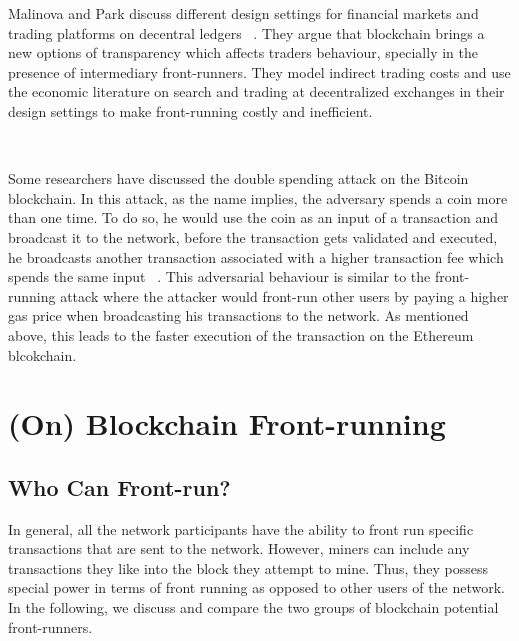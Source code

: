 Malinova and Park discuss different design settings for financial markets and trading platforms on decentral ledgers ~\cite{malinova2017market}.  They argue that blockchain brings a new options of transparency which affects traders behaviour, specially in the presence of intermediary front-runners. They model indirect trading costs and use the economic literature on search and trading at decentralized exchanges in their design settings to make front-running costly and inefficient.


 ~\cite{breidenbach2018enter}
 
Some researchers have discussed the double spending attack on the Bitcoin blockchain. In this attack, as the name implies, the adversary spends a coin more than one time. To do so, he would use the coin as an input of a transaction and broadcast it to the network, before the transaction gets validated and executed, he broadcasts another transaction associated with a higher transaction fee which spends the same input ~\cite{bamert2013have, karame2012double}. This adversarial behaviour is similar to the front-running attack where the attacker would front-run other users by paying a higher gas price when broadcasting his transactions to the network.  As mentioned above, this leads to the faster execution of the transaction on the Ethereum blcokchain.









\section{(On) Blockchain Front-running}

\subsection{Who Can Front-run?}
\label{sec:who can front-run?}

In general, all the network participants have the ability to front run specific transactions that are sent to the network. However, miners can include any transactions they like into the block they attempt to mine. Thus, they possess special power in terms of front running as opposed to other users of the network. In the following, we discuss and compare the two groups of blockchain potential front-runners.

